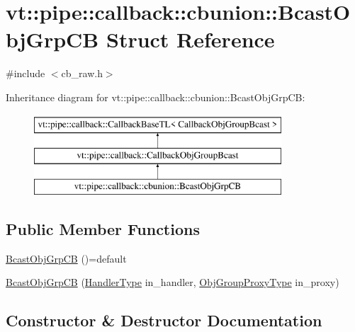 \hypertarget{structvt_1_1pipe_1_1callback_1_1cbunion_1_1_bcast_obj_grp_c_b}{}\section{vt\+:\+:pipe\+:\+:callback\+:\+:cbunion\+:\+:Bcast\+Obj\+Grp\+CB Struct Reference}
\label{structvt_1_1pipe_1_1callback_1_1cbunion_1_1_bcast_obj_grp_c_b}


{\ttfamily \#include $<$cb\+\_\+raw.\+h$>$}

Inheritance diagram for vt\+:\+:pipe\+:\+:callback\+:\+:cbunion\+:\+:Bcast\+Obj\+Grp\+CB\+:\begin{figure}[H]
\begin{center}
\leavevmode
\includegraphics[height=3.000000cm]{structvt_1_1pipe_1_1callback_1_1cbunion_1_1_bcast_obj_grp_c_b}
\end{center}
\end{figure}
\subsection*{Public Member Functions}
\begin{DoxyCompactItemize}
\item 
\hyperlink{structvt_1_1pipe_1_1callback_1_1cbunion_1_1_bcast_obj_grp_c_b_a4932a2fac552d5e52233369151820d86}{Bcast\+Obj\+Grp\+CB} ()=default
\item 
\hyperlink{structvt_1_1pipe_1_1callback_1_1cbunion_1_1_bcast_obj_grp_c_b_acbeca55c248f5f9645300bac030610d2}{Bcast\+Obj\+Grp\+CB} (\hyperlink{namespacevt_af64846b57dfcaf104da3ef6967917573}{Handler\+Type} in\+\_\+handler, \hyperlink{namespacevt_ad7cae989df485fccca57f0792a880a8e}{Obj\+Group\+Proxy\+Type} in\+\_\+proxy)
\end{DoxyCompactItemize}


\subsection{Constructor \& Destructor Documentation}
\mbox{\label{structvt_1_1pipe_1_1callback_1_1cbunion_1_1_bcast_obj_grp_c_b_a4932a2fac552d5e52233369151820d86}} 
